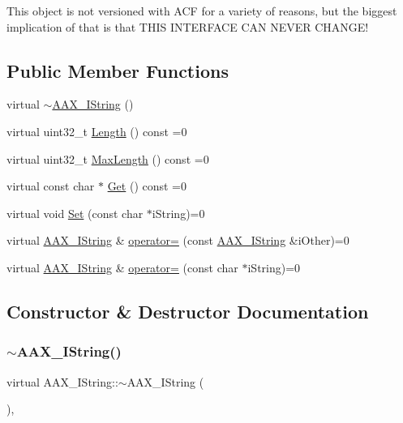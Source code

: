 This object is not versioned with A\+CF for a variety of reasons, but the biggest implication of that is that T\+H\+IS I\+N\+T\+E\+R\+F\+A\+CE C\+AN N\+E\+V\+ER C\+H\+A\+N\+G\+E! \subsection*{Public Member Functions}
\begin{DoxyCompactItemize}
\item 
virtual \mbox{\hyperlink{a01873_a5930db58f3ca89eeccf141ac2bcfe155}{$\sim$\+A\+A\+X\+\_\+\+I\+String}} ()
\item 
virtual uint32\+\_\+t \mbox{\hyperlink{a01873_a4d4440bf68aa5ae4bf3dc6639cbf95c9}{Length}} () const =0
\item 
virtual uint32\+\_\+t \mbox{\hyperlink{a01873_aa898760d69880aeefbd42c0109889c59}{Max\+Length}} () const =0
\item 
virtual const char $\ast$ \mbox{\hyperlink{a01873_a63ff078d3df0d2e0c16c078a2ac4921e}{Get}} () const =0
\item 
virtual void \mbox{\hyperlink{a01873_a9ad28fba3ccc952de495f055a10e3b19}{Set}} (const char $\ast$i\+String)=0
\item 
virtual \mbox{\hyperlink{a01873}{A\+A\+X\+\_\+\+I\+String}} \& \mbox{\hyperlink{a01873_aaaf335636d64612714ffa93859d1a39c}{operator=}} (const \mbox{\hyperlink{a01873}{A\+A\+X\+\_\+\+I\+String}} \&i\+Other)=0
\item 
virtual \mbox{\hyperlink{a01873}{A\+A\+X\+\_\+\+I\+String}} \& \mbox{\hyperlink{a01873_abccb4049e229d265fdb8635342add574}{operator=}} (const char $\ast$i\+String)=0
\end{DoxyCompactItemize}


\subsection{Constructor \& Destructor Documentation}
\mbox{\label{a01873_a5930db58f3ca89eeccf141ac2bcfe155}} 
\subsubsection{\texorpdfstring{$\sim$AAX\_IString()}{~AAX\_IString()}}
{\footnotesize\ttfamily virtual A\+A\+X\+\_\+\+I\+String\+::$\sim$\+A\+A\+X\+\_\+\+I\+String (\begin{DoxyParamCaption}{ }\end{DoxyParamCaption})\hspace{0.3cm}{\ttfamily [inline]}, {\ttfamily [virtual]}}

